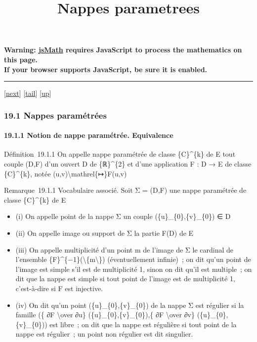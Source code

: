 \documentclass[]{article}
\title{Nappes parametrees}
\author{}
\date{}
\begin{document}
\maketitle

\textbf{Warning: \href{http://www.math.union.edu/locate/jsMath}{jsMath}
requires JavaScript to process the mathematics on this page.\\ If your
browser supports JavaScript, be sure it is enabled.}

\begin{center}\rule{3in}{0.4pt}\end{center}

{[}\href{coursse101.html}{next}{]}
{[}\hyperref[tailcoursse100.html]{tail}{]}
{[}\href{coursch20.html\#coursse100.html}{up}{]}

\subsubsection{19.1 Nappes paramétrées}

\paragraph{19.1.1 Notion de nappe paramétrée. Equivalence}

Définition~19.1.1 On appelle nappe paramétrée de classe \{C\}\^{}\{k\}
de E tout couple (D,F) d'un ouvert D de \{ℝ\}\^{}\{2\} et d'une
application F : D → E de classe \{C\}\^{}\{k\}, notée
(u,v)\textbackslash{}mathrel\{↦\}F(u,v)

Remarque~19.1.1 Vocabulaire associé. Soit Σ = (D,F) une nappe paramétrée
de classe \{C\}\^{}\{k\} de E

\begin{itemize}
\itemsep1pt\parskip0pt
\item
  (i) On appelle point de la nappe Σ un couple
  (\{u\}\_\{0\},\{v\}\_\{0\}) ∈ D
\item
  (ii) On appelle image ou support de Σ la partie F(D) de E
\item
  (iii) On appelle multiplicité d'un point m de l'image de Σ le cardinal
  de l'ensemble \{F\}\^{}\{−1\}(\textbackslash{}\{m\textbackslash{}\})
  (éventuellement infinie)~; on dit qu'un point de l'image est simple
  s'il est de multiplicité 1, sinon on dit qu'il est multiple~; on dit
  que la nappe est simple si tout point de l'image est de multiplicité
  1, c'est-à-dire si F est injective.
\item
  (iv) On dit qu'un point (\{u\}\_\{0\},\{v\}\_\{0\}) de la nappe Σ est
  régulier si la famille (\{ ∂F \textbackslash{}over ∂u\}
  (\{u\}\_\{0\},\{v\}\_\{0\}),\{ ∂F \textbackslash{}over ∂v\}
  (\{u\}\_\{0\},\{v\}\_\{0\})) est libre~; on dit que la nappe est
  régulière si tout point de la nappe est régulier~; un point non
  régulier est dit singulier.
\end{itemize}
\end{document}
